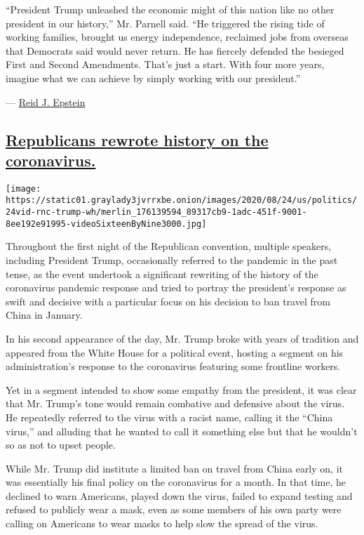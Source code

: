 ``President Trump unleashed the economic might of this nation like no
other president in our history,'' Mr. Parnell said. ``He triggered the
rising tide of working families, brought us energy independence,
reclaimed jobs from overseas that Democrats said would never return. He
has fiercely defended the besieged First and Second Amendments. That's
just a start. With four more years, imagine what we can achieve by
simply working with our president.''

--- \href{https://www.nytimes3xbfgragh.onion/by/reid-j-epstein}{Reid J.
Epstein}

\hypertarget{republicans-rewrote-history-on-the-coronavirus}{%
\subsection{\texorpdfstring{\protect\hyperlink{republicans-rewrote-history-on-the-coronavirus}{Republicans
rewrote history on the
coronavirus.}}{Republicans rewrote history on the coronavirus.}}\label{republicans-rewrote-history-on-the-coronavirus}}

\texttt{[image: https://static01.graylady3jvrrxbe.onion/images/2020/08/24/us/politics/24vid-rnc-trump-wh/merlin\_176139594\_89317cb9-1adc-451f-9001-8ee192e91995-videoSixteenByNine3000.jpg]}

Throughout the first night of the Republican convention, multiple
speakers, including President Trump, occasionally referred to the
pandemic in the past tense, as the event undertook a significant
rewriting of the history of the coronavirus pandemic response and tried
to portray the president's response as swift and decisive with a
particular focus on his decision to ban travel from China in January.

In his second appearance of the day, Mr. Trump broke with years of
tradition and appeared from the White House for a political event,
hosting a segment on his administration's response to the coronavirus
featuring some frontline workers.

Yet in a segment intended to show some empathy from the president, it
was clear that Mr. Trump's tone would remain combative and defensive
about the virus. He repeatedly referred to the virus with a racist name,
calling it the ``China virus,'' and alluding that he wanted to call it
something else but that he wouldn't so as not to upset people.

While Mr. Trump did institute a limited ban on travel from China early
on, it was essentially his final policy on the coronavirus for a month.
In that time, he declined to warn Americans, played down the virus,
failed to expand testing and refused to publicly wear a mask, even as
some members of his own party were calling on Americans to wear masks to
help slow the spread of the virus.

